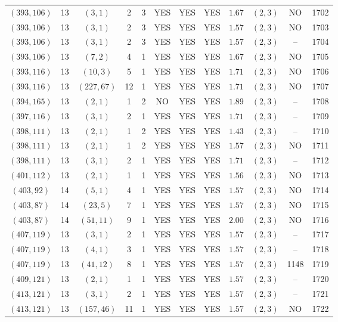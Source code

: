 \begin{longtable}{|c|c|c|c|c|c|c|c|c|c|c|c|}
$(393,106)$ & 13 & $(3,1)$ & 2 & 3 & YES & YES & YES & $1.67$ & $(2,3)$ & NO & 1702\\
$(393,106)$ & 13 & $(3,1)$ & 2 & 3 & YES & YES & YES & $1.57$ & $(2,3)$ & NO & 1703\\
$(393,106)$ & 13 & $(3,1)$ & 2 & 3 & YES & YES & YES & $1.57$ & $(2,3)$ & -- & 1704\\
$(393,106)$ & 13 & $(7,2)$ & 4 & 1 & YES & YES & YES & $1.67$ & $(2,3)$ & NO & 1705\\
$(393,116)$ & 13 & $(10,3)$ & 5 & 1 & YES & YES & YES & $1.71$ & $(2,3)$ & NO & 1706\\
$(393,116)$ & 13 & $(227,67)$ & 12 & 1 & YES & YES & YES & $1.71$ & $(2,3)$ & NO & 1707\\
$(394,165)$ & 13 & $(2,1)$ & 1 & 2 & NO & YES & YES & $1.89$ & $(2,3)$ & -- & 1708\\
$(397,116)$ & 13 & $(3,1)$ & 2 & 1 & YES & YES & YES & $1.71$ & $(2,3)$ & -- & 1709\\
$(398,111)$ & 13 & $(2,1)$ & 1 & 2 & YES & YES & YES & $1.43$ & $(2,3)$ & -- & 1710\\
$(398,111)$ & 13 & $(2,1)$ & 1 & 2 & YES & YES & YES & $1.57$ & $(2,3)$ & NO & 1711\\
$(398,111)$ & 13 & $(3,1)$ & 2 & 1 & YES & YES & YES & $1.71$ & $(2,3)$ & -- & 1712\\
$(401,112)$ & 13 & $(2,1)$ & 1 & 1 & YES & YES & YES & $1.56$ & $(2,3)$ & NO & 1713\\
$(403,92)$ & 14 & $(5,1)$ & 4 & 1 & YES & YES & YES & $1.57$ & $(2,3)$ & NO & 1714\\
$(403,87)$ & 14 & $(23,5)$ & 7 & 1 & YES & YES & YES & $1.57$ & $(2,3)$ & NO & 1715\\
$(403,87)$ & 14 & $(51,11)$ & 9 & 1 & YES & YES & YES & $2.00$ & $(2,3)$ & NO & 1716\\
$(407,119)$ & 13 & $(3,1)$ & 2 & 1 & YES & YES & YES & $1.57$ & $(2,3)$ & -- & 1717\\
$(407,119)$ & 13 & $(4,1)$ & 3 & 1 & YES & YES & YES & $1.57$ & $(2,3)$ & -- & 1718\\
$(407,119)$ & 13 & $(41,12)$ & 8 & 1 & YES & YES & YES & $1.57$ & $(2,3)$ & 1148 & 1719\\
$(409,121)$ & 13 & $(2,1)$ & 1 & 1 & YES & YES & YES & $1.57$ & $(2,3)$ & -- & 1720\\
$(413,121)$ & 13 & $(3,1)$ & 2 & 1 & YES & YES & YES & $1.57$ & $(2,3)$ & -- & 1721\\
$(413,121)$ & 13 & $(157,46)$ & 11 & 1 & YES & YES & YES & $1.57$ & $(2,3)$ & NO & 1722\\

\end{longtable}
